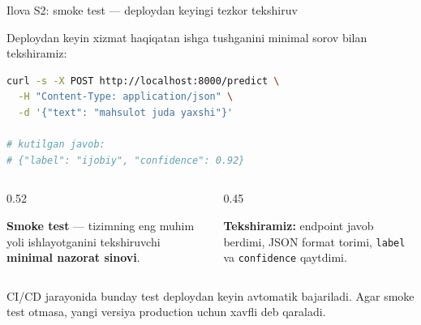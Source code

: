 \documentclass[aspectratio=169,11pt]{beamer}
\newcommand{\uzq}{\textquotesingle{}}   %
\begin{document}
\begin{frame}[fragile]{Ilova S2: smoke test --- deploydan keyingi tezkor tekshiruv}
  \small

  Deploydan keyin xizmat haqiqatan ishga tushganini minimal so\uzq{}rov bilan
  tekshiramiz:

\begin{lstlisting}[language=bash,basicstyle=\ttfamily\scriptsize]
curl -s -X POST http://localhost:8000/predict \
  -H "Content-Type: application/json" \
  -d '{"text": "mahsulot juda yaxshi"}'

# kutilgan javob:
# {"label": "ijobiy", "confidence": 0.92}
\end{lstlisting}

  \vspace{3pt}

  \begin{columns}[T,totalwidth=\textwidth]
    \begin{column}{0.52\textwidth}
      \begin{tcolorbox}[defbox,top=2pt,bottom=2pt,left=4pt,right=4pt]
        \footnotesize
        \textbf{Smoke test} --- tizimning eng muhim yo\uzq{}li ishlayotganini
        tekshiruvchi \textbf{minimal nazorat sinovi}.
      \end{tcolorbox}
    \end{column}

    \begin{column}{0.45\textwidth}
      \begin{tcolorbox}[okbox,top=2pt,bottom=2pt,left=4pt,right=4pt]
        \footnotesize
        \textbf{Tekshiramiz:}
        endpoint javob berdimi, JSON format to\uzq{}rimi,
        \texttt{label} va \texttt{confidence} qaytdimi.
      \end{tcolorbox}
    \end{column}
  \end{columns}

  \vspace{3pt}

  {\scriptsize
  CI/CD jarayonida bunday test deploydan keyin avtomatik bajariladi.
  Agar smoke test o\uzq{}tmasa, yangi versiya production uchun xavfli deb qaraladi.
  }
\end{frame}
\end{document}
